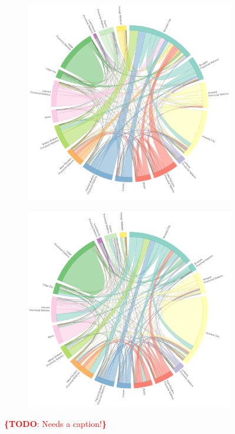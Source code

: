 \documentclass{sig-alternate}
\newcommand{\todo}[1]{\noindent\textcolor{red}{{\bf \{TODO}: #1{\bf \}}}}
\begin{document}
\begin{figure}
  \centering
  \begin{subfigure}{\textwidth}
    \centering
    \includegraphics[width=13cm]{weekdays_morning.pdf}\\
    \label{fig:weekdays_morning}
  \end{subfigure}
  \begin{subfigure}{\textwidth}
    \centering
    \includegraphics[width=13cm]{weekends_morning.pdf}\\
    \label{fig:weekends_morning}
  \end{subfigure}
  \vspace{5.0pt}%
  \label{fig:mornings}
  \caption{\todo{Needs a caption!}}
\end{figure}
\end{document}
